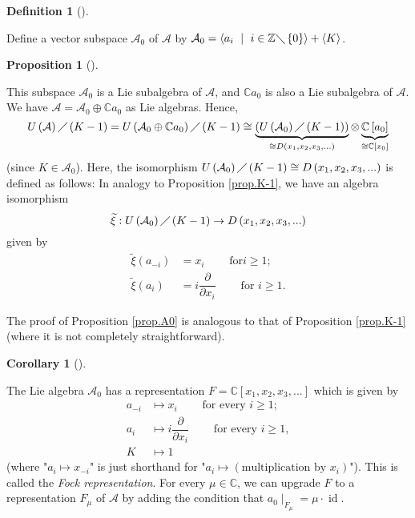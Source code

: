 \documentclass
[numbers=enddot,12pt,final,onecolumn,german,notitlepage]{scrartcl}%
\theoremstyle{definition}
\newtheorem{prop}[theo]{Proposition}
\newenvironment{proposition}[1][]
{\begin{prop}[#1]\begin{leftbar}}
{\end{leftbar}\end{prop}}
\newtheorem{defi}[theo]{Definition}
\newenvironment{definition}[1][]
{\begin{defi}[#1]\begin{leftbar}}
{\end{leftbar}\end{defi}}
\newtheorem{coro}[theo]{Corollary}
\newenvironment{corollary}[1][]
{\begin{coro}[#1]\begin{leftbar}}
{\end{leftbar}\end{coro}}
\begin{document}
\begin{definition}
\label{def.A0}Define a vector subspace $\mathcal{A}_{0}$ of $\mathcal{A}$ by
$\mathcal{A}_{0}=\left\langle a_{i}\ \mid\ i\in\mathbb{Z}\diagdown\left\{
0\right\}  \right\rangle +\left\langle K\right\rangle $.
\end{definition}

\begin{proposition}
\label{prop.A0}This subspace $\mathcal{A}_{0}$ is a Lie subalgebra of
$\mathcal{A}$, and $\mathbb{C}a_{0}$ is also a Lie subalgebra of $\mathcal{A}%
$. We have $\mathcal{A}=\mathcal{A}_{0}\oplus\mathbb{C}a_{0}$ as Lie algebras.
Hence,%
\[
U\left(  \mathcal{A}\right)  \diagup\left(  K-1\right)  =U\left(
\mathcal{A}_{0}\oplus\mathbb{C}a_{0}\right)  \diagup\left(  K-1\right)
\cong\underbrace{\left(  U\left(  \mathcal{A}_{0}\right)  \diagup\left(
K-1\right)  \right)  }_{\cong D\left(  x_{1},x_{2},x_{3},...\right)  }%
\otimes\underbrace{\mathbb{C}\left[  a_{0}\right]  }_{\cong\mathbb{C}\left[
x_{0}\right]  }%
\]
(since $K\in\mathcal{A}_{0}$). Here, the isomorphism $U\left(  \mathcal{A}%
_{0}\right)  \diagup\left(  K-1\right)  \cong D\left(  x_{1},x_{2}%
,x_{3},...\right)  $ is defined as follows: In analogy to Proposition
\ref{prop.K-1}, we have an algebra isomorphism%
\[
\widetilde{\xi}:U\left(  \mathcal{A}_{0}\right)  \diagup\left(  K-1\right)
\rightarrow D\left(  x_{1},x_{2},x_{3},...\right)
\]
given by%
\begin{align*}
\widetilde{\xi}\left(  a_{-i}\right)   &  =x_{i}\ \ \ \ \ \ \ \ \ \ \text{for
}i\geq1;\\
\widetilde{\xi}\left(  a_{i}\right)   &  =i\dfrac{\partial}{\partial x_{i}%
}\ \ \ \ \ \ \ \ \ \ \text{for }i\geq1.
\end{align*}

\end{proposition}

The proof of Proposition \ref{prop.A0} is analogous to that of Proposition
\ref{prop.K-1} (where it is not completely straightforward).

\begin{corollary}
\label{cor.fock}The Lie algebra $\mathcal{A}_{0}$ has a representation
$F=\mathbb{C}\left[  x_{1},x_{2},x_{3},...\right]  $ which is given by
\begin{align*}
a_{-i}  &  \mapsto x_{i}\ \ \ \ \ \ \ \ \ \ \text{for every }i\geq1;\\
a_{i}  &  \mapsto i\dfrac{\partial}{\partial x_{i}}%
\ \ \ \ \ \ \ \ \ \ \text{for every }i\geq1,\\
K  &  \mapsto1
\end{align*}
(where "$a_{i}\mapsto x_{-i}$" is just shorthand for "$a_{i}\mapsto\left(
\text{multiplication by }x_{i}\right)  $"). This is called the \textit{Fock
representation}. For every $\mu\in\mathbb{C}$, we can upgrade $F$ to a
representation $F_{\mu}$ of $\mathcal{A}$ by adding the condition that
$a_{0}\mid_{F_{\mu}}=\mu\cdot\operatorname*{id}$.
\end{corollary}
\end{document}
